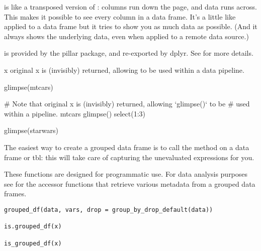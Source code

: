 \documentclass[a4paper]{book}
\begin{document}
%
\begin{Description}
 is like a transposed version of :
columns run down the page, and data runs across.
This makes it possible to see every column in a data frame.
It's a little like  applied to a data frame
but it tries to show you as much data as possible.
(And it always shows the underlying data, even when applied
to a remote data source.)

 is provided by the pillar package, and re-exported
by dplyr. See  for more details.
\end{Description}
%
\begin{Value}
x original x is (invisibly) returned, allowing  to be
used within a data pipeline.
\end{Value}
%
\begin{Examples}
\begin{ExampleCode}
glimpse(mtcars)

# Note that original x is (invisibly) returned, allowing `glimpse()` to be
# used within a pipeline.
mtcars %
  glimpse() %
  select(1:3)

glimpse(starwars)
\end{ExampleCode}
\end{Examples}
%
\begin{Description}
The easiest way to create a grouped data frame is to call the 
method on a data frame or tbl: this will take care of capturing
the unevaluated expressions for you.

These functions are designed for programmatic use. For data analysis
purposes see  for the accessor functions that retrieve
various metadata from a grouped data frames.
\end{Description}
%
\begin{Usage}
\begin{verbatim}
grouped_df(data, vars, drop = group_by_drop_default(data))

is.grouped_df(x)

is_grouped_df(x)
\end{verbatim}
\end{Usage}
\end{document}
